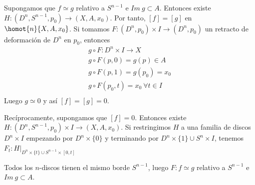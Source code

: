 \begin{demo}
Supongamos que $f \simeq g$ relativo a $S^{n-1}$ e $Im \ g \subset A$. Entonces existe $H : (D^n, S^{n-1}, p_0) \longrightarrow (X, A, x_0)$. Por tanto, $[f] = [g]$ en $\homot{n}{X, A, x_0}$. Si tomamos $F: (D^n, p_0) \times I \longrightarrow (D^n, p_0)$ un retracto de deformación de $D^n$ en $p_0$, entonces 
\begin{align*}
g \circ F : D^n \times I \longrightarrow X \\
g \circ F (p,0) = g(p) \in A \\
g \circ F (p,1) = g(p_0) = x_0 \\
g \circ F (p_0, t) = x_0 \ \forall t \in I \\
\end{align*}
Luego $g \simeq 0$ y así $[f]=[g]=0$. \par
Recíprocamente, supongamos que $[f]=0$. Entonces existe $H: (D^n, S^{n-1}, p_0) \times I \longrightarrow (X, A, x_0) $. Si restringimos $H$ a una familia de discos $D^n \times I$ empezando por $D^n \times \{0\}$ y terminando por $D^n \times \{1\} \cup S^n \times I$, tenemos $F_t: H \vert_{D^n \times \{t\} \cup S^{n-1} \times [0, t]}$ \par
Todos los $n$-discos tienen el mismo borde $S^{n-1}$, luego $F : f \simeq g$ relativo a $S^{n-1}$ e $Im \ g \subset A$. \par
{}
\end{demo}

